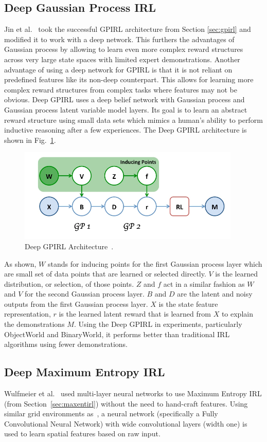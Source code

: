 \documentclass[12pt,american]{report}
\begin{document}
\subsection{Deep Gaussian Process IRL}
Jin et al.~\cite{jin2015inverse} took the successful GPIRL architecture from Section \ref{sec:gpirl} and modified it to work with a deep network. This furthers the advantages of Gaussian process by allowing to learn even more complex reward structures across very large state spaces with limited expert demonstrations. Another advantage of using a deep network for GPIRL is that it is not reliant on predefined features like its non-deep counterpart.  This allows for learning more complex reward structures from complex tasks where features may not be obvious.  Deep GPIRL uses a deep belief network with Gaussian process and Gaussian process latent variable model layers. Its goal is to learn an abstract reward structure using small data sets which mimics a human's ability to perform inductive reasoning after a few experiences. The Deep GPIRL architecture is shown in Fig.~\ref{fig:dgpirl-arch}.
\begin{figure}
\centering
\includegraphics[scale=1.5]{images/dgpirl-arch.png}
\caption{Deep GPIRL Architecture~\cite{jin2015inverse}.}
\label{fig:dgpirl-arch}
\end{figure}
 As shown, $W$ stands for inducing points for the first Gaussian process layer which are small set of data points that are learned or selected directly. $V$ is the learned distribution, or selection, of those points.  $Z$ and $f$ act in a similar fashion as $W$ and $V$ for the second Gaussian process layer. $B$ and $D$ are the latent and noisy outputs from the first Gaussian process layer. $X$ is the state feature representation, $r$ is the learned latent reward that is learned from $X$ to explain the demonstrations $M$.  Using the Deep GPIRL in experiments, particularly ObjectWorld and BinaryWorld, it performs better than traditional IRL algorithms using fewer demonstrations. 

\label{sec:maxentdeepirl}
\subsection{Deep Maximum Entropy IRL}
Wulfmeier et al.~\cite{wulfmeier2015maximum} used multi-layer neural networks to use Maximum Entropy IRL (from Section~\ref{sec:maxentirl}) without the need to hand-craft features. Using similar grid environments as~\cite{ziebart2008maximum}, a neural network (specifically a Fully Convolutional Neural Network) with wide convolutional layers (width one) is used to learn spatial features based on raw input.  
\end{document}
